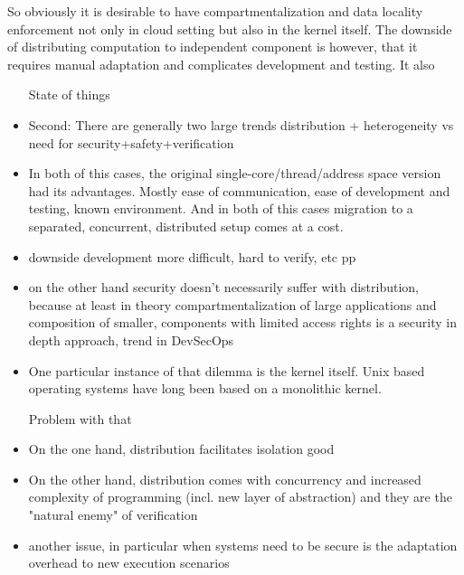 So obviously it is desirable to have compartmentalization and data locality enforcement not only in cloud setting but also in the kernel itself. The downside of distributing computation to independent component is however, that it requires manual adaptation and complicates development and testing. It also 


\begin{itemize}
    \item[State of things]
    \item Second: There are generally two large trends \means distribution + heterogeneity vs need for security+safety+verification 
    \item In both of this cases, the original single-core/thread/address space version had its advantages. Mostly ease of communication, ease of development and testing, known environment. And in both of this cases migration to a separated, concurrent, distributed setup comes at a cost. 
    \item downside \means development more difficult, hard to verify, etc pp
    \item on the other hand security doesn't necessarily suffer with distribution, because at least in theory compartmentalization of large applications and composition of smaller, components with limited access rights is a security in depth approach, trend in DevSecOps
    \item One particular instance of that dilemma is the kernel itself. Unix based operating systems have long been based on a monolithic kernel. 
    
    \item[Problem with that]
    \item On the one hand, distribution facilitates isolation \means good
    \item On the other hand, distribution comes with concurrency and increased complexity of programming (incl. new layer of abstraction) and they are the "natural enemy" of verification
    \item another issue, in particular when systems need to be secure is the adaptation overhead to new execution scenarios



\end{itemize}
